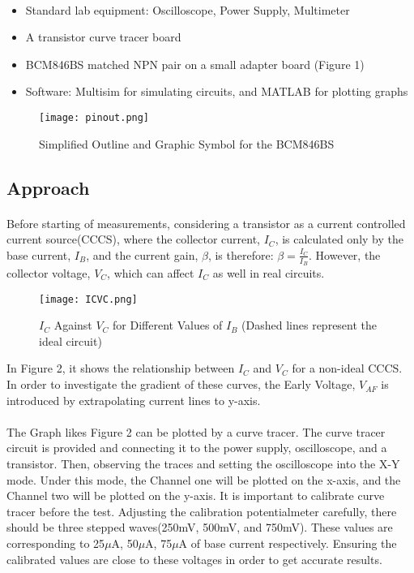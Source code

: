 \documentclass[12pt]{article}
\begin{document}
    \paragraph{}
    \begin{itemize}
    \item
    Standard lab equipment: Oscilloscope, Power Supply, Multimeter
    \item 
    A transistor curve tracer board
    \item
    BCM846BS matched NPN pair on a small adapter board (Figure 1)
    \item
    Software: Multisim for simulating circuits, and MATLAB for plotting graphs
    \end{itemize}
    \begin{figure}[H]
    \centering
    \texttt{[image: pinout.png]}
    \caption{Simplified Outline and Graphic Symbol for the BCM846BS\cite{2}}
    \end{figure}
    
    \subsection{Approach}
    \paragraph{}
    Before starting of measurements, considering a transistor as a current controlled current source(CCCS), where the collector current, $I_C$, is calculated only by the base current, $I_B$, and the current gain, $\beta$, is therefore: $\beta = \frac{I_C}{I_B}$. However, the collector voltage, $V_C$, which can affect $I_C$ as well in real circuits.
    \begin{figure}[H]
    \centering
    \texttt{[image: ICVC.png]}
    \caption{$I_C$ Against $V_C$ for Different Values of $I_B$ (Dashed lines represent the ideal circuit)}
    \end{figure}
    In Figure 2, it shows the relationship between $I_C$ and $V_C$ for a non-ideal CCCS. In order to investigate the gradient of these curves, the Early Voltage, $V_{AF}$ is introduced by extrapolating current lines to y-axis.
    
    \paragraph{}
    The Graph likes Figure 2 can be plotted by a curve tracer. The curve tracer circuit is provided and connecting it to the power supply, oscilloscope, and a transistor. Then, observing the traces and setting the oscilloscope into the X-Y mode. Under this mode, the Channel one will be plotted on the x-axis, and the Channel two will be plotted on the y-axis. It is important to calibrate curve tracer before the test. Adjusting the calibration potentialmeter carefully, there should be three stepped waves(250mV, 500mV, and 750mV). These values are corresponding to 25$\mu$A, 50$\mu$A, 75$\mu$A of base current respectively. Ensuring the calibrated values are close to these voltages in order to get accurate results.  
    
\end{document}
